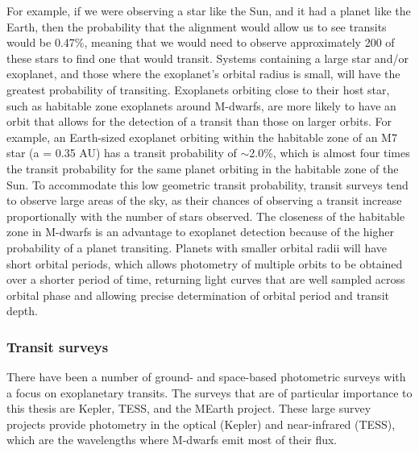 For example, if we were observing a star like the Sun, and it had a planet like the Earth, then the probability that the alignment would allow us to see transits would be 0.47\%\citep{2003Borucki}, meaning that we would need to observe approximately 200 of these stars to find one that would transit. Systems containing a large star and/or exoplanet, and those where the exoplanet's orbital radius is small, will have the greatest probability of transiting. Exoplanets orbiting close to their host star, such as habitable zone exoplanets around M-dwarfs, are more likely to have an orbit that allows for the detection of a transit than those on larger orbits. For example, an Earth-sized exoplanet orbiting within the habitable zone of an M7 star (a = 0.35 AU) has a transit probability of $\sim$2.0\%, which is almost four times the transit probability for the same planet orbiting in the habitable zone of the Sun. To accommodate this low geometric transit probability, transit surveys tend to observe large areas of the sky, as their chances of observing a transit increase proportionally with the number of stars observed. The closeness of the habitable zone in M-dwarfs is an advantage to exoplanet detection because of the higher probability of a planet transiting. Planets with smaller orbital radii will have short orbital periods, which allows photometry of multiple orbits to be obtained over a shorter period of time, returning light curves that are well sampled across orbital phase and allowing precise determination of orbital period and transit depth.\\

\subsubsection{Transit surveys}
\label{secTransitSurveys}
There have been a number of ground- and space-based photometric surveys with a focus on exoplanetary transits. The surveys that are of particular importance to this thesis are Kepler, TESS, and the MEarth project. These large survey projects provide photometry in the optical (Kepler) and near-infrared (TESS), which are the wavelengths where M-dwarfs emit most of their flux.\\

